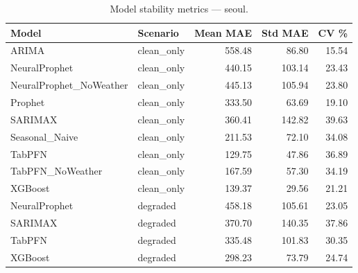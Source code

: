 \begin{table}[h]
\centering
\caption{Model stability metrics — seoul.}
\label{tab:stability_seoul}
\begin{tabular}{llrrr}
\toprule
Model & Scenario & Mean MAE & Std MAE & CV \% \\
\midrule
ARIMA & clean\_only & 558.48 & 86.80 & 15.54 \\
NeuralProphet & clean\_only & 440.15 & 103.14 & 23.43 \\
NeuralProphet_NoWeather & clean\_only & 445.13 & 105.94 & 23.80 \\
Prophet & clean\_only & 333.50 & 63.69 & 19.10 \\
SARIMAX & clean\_only & 360.41 & 142.82 & 39.63 \\
Seasonal_Naive & clean\_only & 211.53 & 72.10 & 34.08 \\
TabPFN & clean\_only & 129.75 & 47.86 & 36.89 \\
TabPFN_NoWeather & clean\_only & 167.59 & 57.30 & 34.19 \\
XGBoost & clean\_only & 139.37 & 29.56 & 21.21 \\
NeuralProphet & degraded & 458.18 & 105.61 & 23.05 \\
SARIMAX & degraded & 370.70 & 140.35 & 37.86 \\
TabPFN & degraded & 335.48 & 101.83 & 30.35 \\
XGBoost & degraded & 298.23 & 73.79 & 24.74 \\
\bottomrule
\end{tabular}
\end{table}
